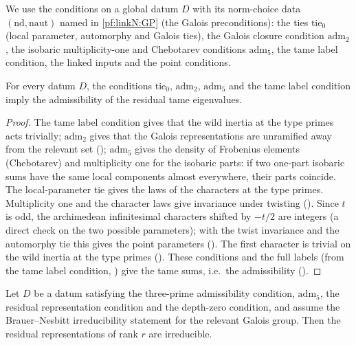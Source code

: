 We use the conditions on a global datum $D$ with its norm-choice data $(\mathrm{nd},\mathrm{naut})$ named in \cref{pf:linkN:GP}
(the Galois preconditions): the ties $\mathrm{tie}_0$ (local parameter, automorphy and Galois ties), the Galois closure condition
$\mathrm{adm}_2$, the isobaric multiplicity-one and Chebotarev conditions $\mathrm{adm}_5$, the tame label condition, the linked
inputs and the point conditions.

\begin{lemma}\label{pf:stageU:admtame}
For every datum $D$, the conditions $\mathrm{tie}_0$, $\mathrm{adm}_2$, $\mathrm{adm}_5$ and the tame label condition imply the admissibility of the
residual tame eigenvalues.
\end{lemma}

\begin{proof}
The tame label condition gives that the wild inertia at the type primes acts trivially; $\mathrm{adm}_2$ gives that the Galois
representations are unramified away from the relevant set (); $\mathrm{adm}_5$ gives the
density of Frobenius elements (Chebotarev) and multiplicity one for the isobaric parts: if two one-part isobaric sums have the same
local components almost everywhere, their parts coincide. The local-parameter tie gives the laws of the characters at the type
primes. Multiplicity one and the character laws give invariance under twisting
(). Since $t$ is odd, the archimedean infinitesimal characters shifted by
$-t/2$ are integers (a direct check on the two possible parameters); with the twist invariance and the automorphy tie this gives the
point parameters (). The first character is trivial on the wild inertia at the type
primes (). These conditions and the full labels (from the tame
label condition, ) give the tame sums, i.e.\ the admissibility
().
\end{proof}

\begin{lemma}\label{pf:stageU:resirr}
Let $D$ be a datum satisfying the three-prime admissibility condition, $\mathrm{adm}_5$, the residual representation condition and
the depth-zero condition, and assume the Brauer--Nesbitt irreducibility statement for the relevant Galois group. Then the residual
representations of rank $r$ are irreducible.
\end{lemma}

